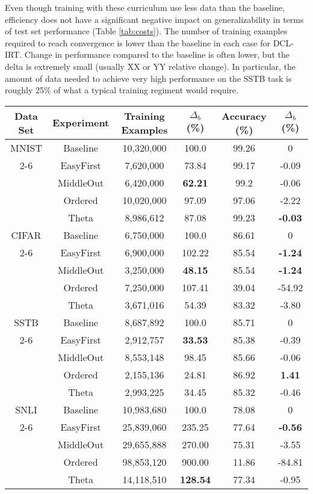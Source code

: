 \documentclass[letterpaper]{article} %
\begin{document}
Even though training with these curriculum use less data than the baseline, efficiency does not have a significant negative impact on generalizability in terms of test set performance (Table \ref{tab:costs}).
The number of training examples required to reach convergence is lower than the baseline in each case for DCL-IRT.
Change in performance compared to the baseline is often lower, but the delta is extremely small (usually XX or YY relative change). 
In particular, the amount of data needed to achieve very high performance on the SSTB task is roughly 25\% of what a typical training regiment would require.


\begin{table*}[h!]
	\centering 
	\begin{tabular}{cccccc}
		\toprule
		Data Set & Experiment & Training Examples & $\Delta_b$ (\%) & Accuracy (\%) & $\Delta_b$ (\%)\\ 
		\midrule
		MNIST & Baseline & 10,320,000& 100.0&	99.26&	0
		 \\
		 \cmidrule{2-6}
		& EasyFirst & 7,620,000&	73.84&	99.17&	-0.09
		 \\
		& MiddleOut & 6,420,000	&\bf 62.21	&99.2&	-0.06
		 \\
		& Ordered &10,020,000&	97.09&	97.06&	-2.22
		 \\
		& Theta& 8,986,612&	87.08&	99.23&	\bf -0.03
		 \\
		\midrule
		CIFAR & Baseline &  6,750,000& 	100.0&	86.61&	0
		 \\
		 \cmidrule{2-6}
		& EasyFirst & 6,900,000&	102.22&	85.54	&\bf -1.24
		 \\
		& MiddleOut & 3,250,000&	\bf 48.15&	85.54&	\bf -1.24
		 \\
		& Ordered &7,250,000&	107.41&	39.04	&-54.92
		 \\
		& Theta &3,671,016	&54.39&	83.32&	-3.80
		 \\
		\midrule
		SSTB & Baseline &  8,687,892 	&100.0	&85.71&	0
		\\
		\cmidrule{2-6}
		& EasyFirst & 2,912,757	&\bf 33.53&	85.38&	-0.39
		 \\
		& MiddleOut & 8,553,148	&98.45&	85.66&	-0.06
		 \\
		& Ordered & 2,155,136&	24.81&	86.92&	\bf 1.41
		 \\
		& Theta &2,993,225&	34.45&	85.32&	-0.46
		 \\
		\midrule
		SNLI & Baseline &  10,983,680& 	100.0&	78.08&	0
		 \\
		 \cmidrule{2-6}
		& EasyFirst & 25,839,060&	235.25&	77.64& \bf	-0.56
		 \\
		& MiddleOut &29,655,888&	270.00&	75.31&	-3.55
		 \\
		& Ordered & 98,853,120&	900.00&	11.86&	-84.81
		 \\
		& Theta& 14,118,510&	\bf 128.54&	77.34&	-0.95
		 \\
		\bottomrule 
	\end{tabular}
	\label{tab:costs}
\end{table*}
\end{document}
